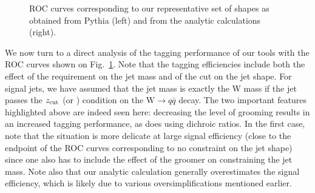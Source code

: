 \begin{figure}
  \centering
  \hfill%
  \caption{ROC curves corresponding to our representative set of
    shapes as obtained from Pythia (left) and from the analytic
    calculations (right).}\label{fig:shape-rocs}
\end{figure}

We now turn to a direct analysis of the tagging performance of our
tools with the ROC curves shown on Fig.~\ref{fig:shape-rocs}.
%
Note that the tagging efficiencies include both the effect of the
requirement on the jet mass and of the cut on the jet shape. For signal
jets, we have assumed that the jet mass is exactly the W mass if
the jet passes the $z_{\text{cut}}$ (or \SD) condition on the $\text{W} \to q\bar q$
decay.
%
The two important features highlighted above are indeed seen here:
decreasing the level of grooming results in an increased tagging
performance, as does using dichroic ratios. In the first case, note
that the situation is more delicate at large signal efficiency (close
to the endpoint of the ROC curves corresponding to no constraint on
the jet shape) since one also has to include the effect of the groomer
on constraining the jet mass.
%
Note also that our analytic calculation generally overestimates the
signal efficiency, which is likely due to various oversimplifications
mentioned earlier.

